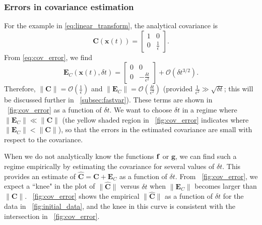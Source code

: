 \subsubsection{Errors in covariance estimation}

For the example in \eqref{eq:linear_transform}, the analytical covariance is
 \begin{equation} \label{eq:cov_linear_example}
\mathbf{C}(\mathbf{x}(t)) =
\begin{bmatrix}
1 & 0 \\
0 & \frac{1}{\epsilon}
\end{bmatrix}.
\end{equation}
%
From \eqref{eq:cov_error}, we find
%
\begin{equation}
\mathbf{E}_C(\mathbf{x}(t), \delta t) =
\begin{bmatrix}
0 & 0 \\
0 & -\frac{\delta t}{\epsilon^2}
\end{bmatrix}
+ \mathcal{O} (\delta t^{3/2}) .
\end{equation}
%
Therefore, $\| \mathbf{C} \| = \mathcal{O} \left( \frac{1}{\epsilon} \right)$ and $\|\mathbf{E}_C \| = \mathcal{O}\left(\frac{\delta t}{\epsilon^2} \right)$ (provided $\frac{1}{\epsilon^2} \gg \sqrt{\delta t}$; this will be discussed further in \sec~\ref{subsec:fastvar}).
%
These terms are shown in \fig~\ref{fig:cov_error} as a function of $\delta t$.
%
We want to choose $\delta t$ in a regime where $\| \mathbf{E}_C \| \ll \| \mathbf{C} \|$ (the yellow shaded region in \fig~\ref{fig:cov_error} indicates where $\| \mathbf{E}_C \| < \| \mathbf{C} \|$), so that the errors in the estimated covariance are small with respect to the covariance.

When we do not analytically know the functions $\mathbf{f}$ or $\mathbf{g}$, we can find such a regime empirically by
estimating the covariance for several values of $\delta t$.
%
This provides an estimate of $\hat{\mathbf{C}} = \mathbf{C} + \mathbf{E}_C$ as a function of $\delta t$.
%
From \fig~\ref{fig:cov_error}, we expect a ``knee" in the plot of $\| \hat{\mathbf{C}} \|$ versus $\delta t$ when $\| \mathbf{E}_C \|$ becomes larger than $\| \mathbf{C}\|$.
%
\fig~\ref{fig:cov_error} shows the empirical $\| \hat{\mathbf{C}} \|$ as a function of $\delta t$ for the data in \fig~\ref{fig:initial_data}, and the knee in this curve is consistent with the intersection in \fig~\ref{fig:cov_error}.

